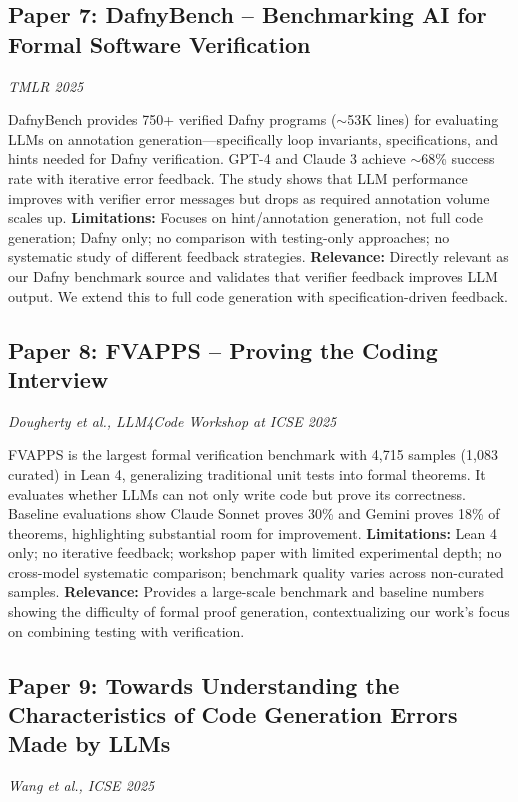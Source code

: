 \documentclass[11pt,a4paper]{article}
\begin{document}
\subsection{Paper 7: DafnyBench -- Benchmarking AI for Formal Software Verification}
\textit{TMLR 2025} \cite{dafnybench2025}

DafnyBench provides 750+ verified Dafny programs ($\sim$53K lines) for evaluating LLMs on annotation generation---specifically loop invariants, specifications, and hints needed for Dafny verification. GPT-4 and Claude 3 achieve $\sim$68\% success rate with iterative error feedback. The study shows that LLM performance improves with verifier error messages but drops as required annotation volume scales up. \textbf{Limitations:} Focuses on hint/annotation generation, not full code generation; Dafny only; no comparison with testing-only approaches; no systematic study of different feedback strategies. \textbf{Relevance:} Directly relevant as our Dafny benchmark source and validates that verifier feedback improves LLM output. We extend this to full code generation with specification-driven feedback.

\subsection{Paper 8: FVAPPS -- Proving the Coding Interview}
\textit{Dougherty et al., LLM4Code Workshop at ICSE 2025} \cite{fvapps2025}

FVAPPS is the largest formal verification benchmark with 4,715 samples (1,083 curated) in Lean 4, generalizing traditional unit tests into formal theorems. It evaluates whether LLMs can not only write code but prove its correctness. Baseline evaluations show Claude Sonnet proves 30\% and Gemini proves 18\% of theorems, highlighting substantial room for improvement. \textbf{Limitations:} Lean 4 only; no iterative feedback; workshop paper with limited experimental depth; no cross-model systematic comparison; benchmark quality varies across non-curated samples. \textbf{Relevance:} Provides a large-scale benchmark and baseline numbers showing the difficulty of formal proof generation, contextualizing our work's focus on combining testing with verification.

\subsection{Paper 9: Towards Understanding the Characteristics of Code Generation Errors Made by LLMs}
\textit{Wang et al., ICSE 2025} \cite{codeerrors2025}
\end{document}
